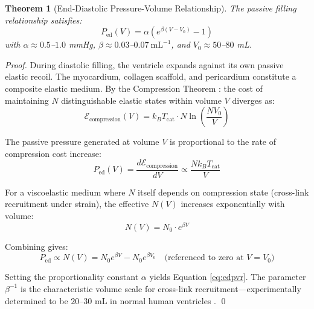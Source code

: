 \documentclass[10pt,twocolumn,a4paper]{article}
\newtheorem{theorem}{Theorem}[section]
\theoremstyle{remark}
\newcommand{\Ped}{P_{\mathrm{ed}}}
\begin{document}
\begin{theorem}[End-Diastolic Pressure-Volume Relationship]
\label{thm:edpvr}
    The passive filling relationship satisfies:
    \begin{equation}
        \boxed{\Ped(V) = \alpha \left(e^{\beta(V - V_0)} - 1\right)}
        \label{eq:edpvr}
    \end{equation}
    with $\alpha \approx 0.5$--$1.0$ mmHg, $\beta \approx 0.03$--$0.07~\mathrm{mL}^{-1}$, and $V_0 \approx 50$--$80$ mL.
\end{theorem}

\begin{proof}
During diastolic filling, the ventricle expands against its own passive elastic recoil. The myocardium, collagen scaffold, and pericardium constitute a composite elastic medium. By the Compression Theorem \cite{sachikonye2024gas}: the cost of maintaining $N$ distinguishable elastic states within volume $V$ diverges as:
\begin{equation}
    \mathcal{E}_{\mathrm{compression}}(V) = k_B T_{\mathrm{cat}} \cdot N \ln\left(\frac{N V_0}{V}\right)
\end{equation}

The passive pressure generated at volume $V$ is proportional to the rate of compression cost increase:
\begin{equation}
    P_{\mathrm{ed}}(V) = \frac{d\mathcal{E}_{\mathrm{compression}}}{dV} \propto \frac{N k_B T_{\mathrm{cat}}}{V}
\end{equation}

For a viscoelastic medium where $N$ itself depends on compression state (cross-link recruitment under strain), the effective $N(V)$ increases exponentially with volume:
\begin{equation}
    N(V) = N_0 \cdot e^{\beta V}
\end{equation}

Combining gives:
\begin{equation}
    P_{\mathrm{ed}} \propto N(V) = N_0 e^{\beta V} - N_0 e^{\beta V_0} \quad\text{(referenced to zero at } V = V_0\text{)}
\end{equation}

Setting the proportionality constant $\alpha$ yields Equation \ref{eq:edpvr}. The parameter $\beta^{-1}$ is the characteristic volume scale for cross-link recruitment—experimentally determined to be $20$--$30$ mL in normal human ventricles \cite{klotz2006single}. \qed
\end{proof}
\end{document}
